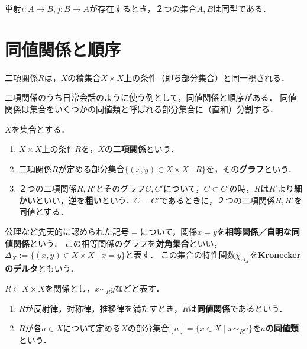 \documentclass[uplatex,dvipdfmx]{jsreport}
\begin{document}
\begin{theorem}[Bernstein]
    単射$i:A\to B,j:B\to A$が存在するとき，２つの集合$A,B$は同型である．
\end{theorem}

\section{同値関係と順序}

\begin{screen}
    二項関係$R$は，$X$の積集合$X\times X$上の条件（即ち部分集合）と同一視される．

    二項関係のうち日常会話のように使う例として，同値関係と順序がある．
    同値関係は集合をいくつかの同値類と呼ばれる部分集合に（直和）分割する．
\end{screen}

\begin{definition}
    $X$を集合とする．
    \begin{enumerate}
        \item $X\times X$上の条件$R$を，$X$の\textbf{二項関係}という．
        \item 二項関係$R$が定める部分集合$\{(x,y)\in X\times X\mid R\}$を，その\textbf{グラフ}という．
        \item ２つの二項関係$R,R'$とそのグラフ$C,C'$について，$C\subset C'$の時，$R$は$R'$より\textbf{細かい}といい，逆を\textbf{粗い}という．$C=C'$であるときに，２つの二項関係$R,R'$を同値とする．
    \end{enumerate}
\end{definition}

\begin{example}
    公理など先天的に認められた記号$=$について，関係$x=y$を\textbf{相等関係／自明な同値関係}という．
    この相等関係のグラフを\textbf{対角集合}といい，$\Delta_X:=\{(x,y)\in X\times X\mid x=y\}$と表す．
    この集合の特性関数$\chi_{\Delta_X}$を\textbf{Kroneckerのデルタ}ともいう．
\end{example}

\begin{definition}
    $R\subset X\times X$を関係とし，$x\sim_R y$などと表す．
    \begin{enumerate}
        \item $R$が反射律，対称律，推移律を満たすとき，$R$は\textbf{同値関係}であるという．
        \item $R$が各$a\in X$について定める$X$の部分集合$[a]=\{x\in X\mid x\sim_Ra\}$を\textbf{$a$の同値類}という．
    \end{enumerate}
\end{definition}
\end{document}
